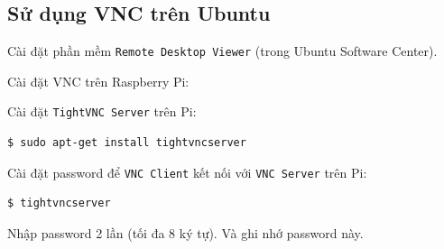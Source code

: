 \subsection{Sử dụng VNC trên Ubuntu}
\begin{list}{--}{}
\item Cài đặt phần mềm \verb|Remote Desktop Viewer| (trong Ubuntu Software Center).
\item Cài đặt VNC trên Raspberry Pi:
\begin{list}{+}{}
\item Cài đặt \verb|TightVNC Server| trên Pi:
\begin{lstlisting}[language=bash]
$ sudo apt-get install tightvncserver
\end{lstlisting}
\item Cài đặt password để \verb|VNC Client| kết nối với \verb|VNC Server| trên Pi:
\begin{lstlisting}[language=bash]
$ tightvncserver
\end{lstlisting}
Nhập password 2 lần (tối đa 8 ký tự). Và ghi nhớ password này.


\end{list}
\end{list}

